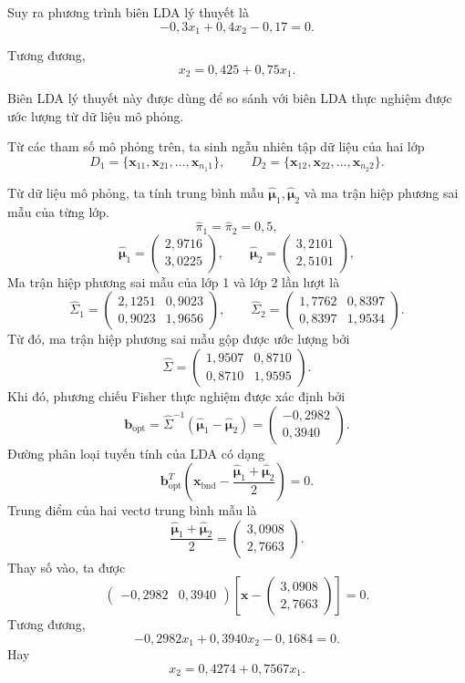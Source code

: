 Suy ra phương trình biên LDA lý thuyết là
\[
-0{,}3x_1+0{,}4x_2-0{,}17=0.
\]

Tương đương,
\[
x_2=0{,}425+0{,}75x_1.
\]

Biên LDA lý thuyết này được dùng để so sánh với biên LDA thực nghiệm được ước lượng từ dữ liệu mô phỏng.

Từ các tham số mô phỏng trên, ta sinh ngẫu nhiên tập dữ liệu của hai lớp
\[
D_1=\{\bm{x}_{11},\bm{x}_{21},\ldots,\bm{x}_{n_1 1}\},
\qquad
D_2=\{\bm{x}_{12},\bm{x}_{22},\ldots,\bm{x}_{n_2 2}\}.
\]

Từ dữ liệu mô phỏng, ta tính trung bình mẫu \(\hat{\bm{\mu}}_1, \hat{\bm{\mu}}_2\) và ma trận hiệp phương sai mẫu của từng lớp. \[ \hat{\pi}_1=\hat{\pi}_2=0{,}5, \] \[ \hat{\bm{\mu}}_1 = \begin{pmatrix} 2{,}9716\\ 3{,}0225 \end{pmatrix}, \qquad \hat{\bm{\mu}}_2 = \begin{pmatrix} 3{,}2101\\ 2{,}5101 \end{pmatrix}, \] 
Ma trận hiệp phương sai mẫu của lớp 1 và lớp 2 lần lượt là \[ \hat{\Sigma}_1 = \begin{pmatrix} 2{,}1251 & 0{,}9023\\ 0{,}9023 & 1{,}9656 \end{pmatrix}, \qquad \hat{\Sigma}_2 = \begin{pmatrix} 1{,}7762 & 0{,}8397\\ 0{,}8397 & 1{,}9534 \end{pmatrix}. \] Từ đó, ma trận hiệp phương sai mẫu gộp được ước lượng bởi \[ \hat{\Sigma} = \begin{pmatrix} 1{,}9507 & 0{,}8710\\ 0{,}8710 & 1{,}9595 \end{pmatrix}. \]
Khi đó, phương chiếu Fisher thực nghiệm được xác định bởi \[ \bm{b}_{\text{opt}} = \hat{\Sigma}^{-1}(\hat{\bm{\mu}}_1-\hat{\bm{\mu}}_2) = \begin{pmatrix} -0{,}2982\\ 0{,}3940 \end{pmatrix}. \] Đường phân loại tuyến tính của LDA có dạng \[ \bm{b}_{\text{opt}}^T \left( \bm{x}_{\text{bnd}} - \frac{\hat{\bm{\mu}}_1 + \hat{\bm{\mu}}_2}{2} \right) = 0. \] Trung điểm của hai vectơ trung bình mẫu là \[ \frac{\hat{\bm{\mu}}_1+\hat{\bm{\mu}}_2}{2} = \begin{pmatrix} 3{,}0908\\ 2{,}7663 \end{pmatrix}. \] Thay số vào, ta được \[ \begin{pmatrix} -0{,}2982 & 0{,}3940 \end{pmatrix} \left[ \bm{x} - \begin{pmatrix} 3{,}0908\\ 2{,}7663 \end{pmatrix} \right] = 0. \] Tương đương, \[ -0{,}2982x_1+0{,}3940x_2-0{,}1684=0. \] Hay \[ x_2=0{,}4274+0{,}7567x_1. \]

